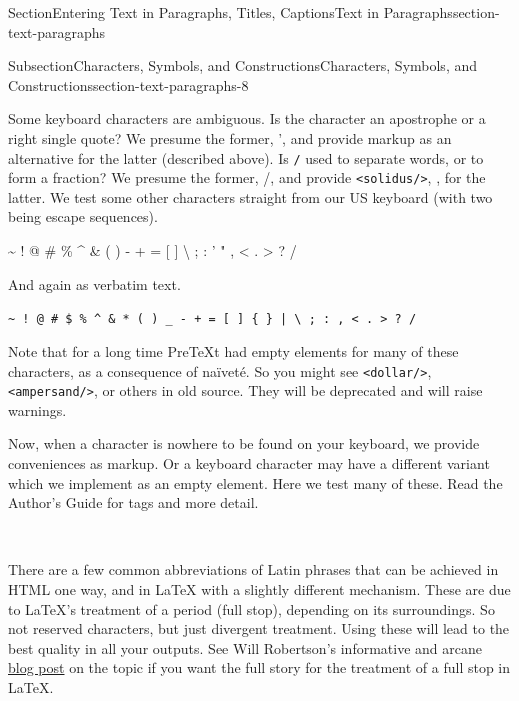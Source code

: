 \documentclass[twoside,10pt,]{article}
\newcommand{\mono}[1]{\texttt{#1}}
\newcommand{\swungdash}{\raisebox{-2.25ex}{\scalebox{2}{\~{}}}}
\numberwithin{equation}{section}
\begin{document}
\begin{sectionptx}{Section}{Entering Text in Paragraphs, Titles, Captions}{}{Text in Paragraphs}{}{}{section-text-paragraphs}
\begin{subsectionptx}{Subsection}{Characters, Symbols, and Constructions}{}{Characters, Symbols, and Constructions}{}{}{section-text-paragraphs-8}
\par
Some keyboard characters are ambiguous.  Is the character \mono{\textquotesingle{}} an apostrophe or a right single quote?  We presume the former, ', and provide markup as an alternative for the latter (described above).  Is \mono{/} used to separate words, or to form a fraction?  We presume the former, \slash{}, and provide \mono{<solidus/>}, \textfractionsolidus{}, for the latter.  We test some other characters straight from our US keyboard (with two being escape sequences).%
\par
\textasciitilde{} \textasciigrave{} ! @ \# \textdollar{} \% \textasciicircum{} \& \textasteriskcentered{} ( ) \textunderscore{} - + = [ ] \textbraceleft{} \textbraceright{} \textbar{} \textbackslash{} ; : ' " , \textless{} . \textgreater{} ? \slash{}%
\par
And again  as verbatim text.%
\par
\mono{\textasciitilde{} \textasciigrave{} ! @ \# \$ \% \textasciicircum{} \& * ( ) \_ - + = [ ] \{ \} | \textbackslash{} ; : \textquotesingle{} \textquotedbl{} , < . > ? /}%
\par
Note that for a long time PreTeXt had empty elements for many of these characters, as a consequence of naïveté.  So you might see \mono{<dollar/>}, \mono{<ampersand/>}, or others in old source.  They will be deprecated and will raise warnings.%
\par
Now, when a character is nowhere to be found on your keyboard, we provide conveniences as markup.  Or a keyboard character may have a different variant which we implement as an empty element.  Here we test many of these.  Read the Author's Guide for tags and more detail.%
\par
\textcopyright{}~~ \textcircledP{}~~ \textcopyleft{}~~ \textregistered{}~~ \texttrademark{}~~ \textservicemark{}~~ \textellipsis{}~~ \textperiodcentered{}~~ \swungdash{}~~ \textperthousand{}~~ \textpilcrow{}~~ \textsection{}~~ \textminus{}~~ \texttimes{}~~ \textfractionsolidus{}~~ \textdiv{}~~ \textpm{}%
\par
There are a few  common abbreviations of Latin phrases that can be achieved in HTML one way, and in \LaTeX{} with a slightly different mechanism.  These are due to \LaTeX{}'s treatment of a period (full stop), depending on its surroundings.  So not reserved characters, but just divergent treatment.  Using these will lead to the best quality in all your outputs.  See Will Robertson's informative and arcane \href{http://latex-alive.tumblr.com/post/827168808/correct-punctuation-spaces}{blog post} on the topic if you want the full story for the treatment of a full stop in \LaTeX{}.%

\end{subsectionptx}
\end{sectionptx}
\end{document}
